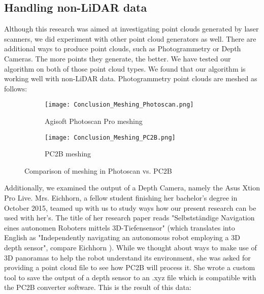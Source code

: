 \subsection{Handling non-LiDAR data}

Although this research was aimed at investigating point clouds generated by laser scanners, we did experiment with other point cloud generators as well. There are additional ways to produce point clouds, such as Photogrammetry or Depth Cameras. The more points they generate, the better. We have tested our algorithm on both of those point cloud types. We found that our algorithm is working well with non-LiDAR data. Photogrammetry point clouds are meshed as follows:

\begin{figure}[h]
	\centering
	\begin{subfigure}[b]{0.49\textwidth}
		\centering
		\texttt{[image: Conclusion\_Meshing\_Photoscan.png]}
		\caption{Agisoft Photoscan Pro meshing}
		\label{fig:conclusion_meshing_photoscan}
	\end{subfigure}
	\hfill
	\begin{subfigure}[b]{0.49\textwidth}
		\centering
		\texttt{[image: Conclusion\_Meshing\_PC2B.png]}
		\caption{PC2B meshing}
		\label{fig:conclusion_meshing_pc2b}
	\end{subfigure}
	\caption{Comparison of meshing in Photoscan vs. PC2B}
	\label{fig:conclusion_meshing_photoscan_vs_pc2b}
\end{figure}

\pagebreak

Additionally, we examined the output of a Depth Camera, namely the Asus Xtion Pro Live. Mrs. Eichhorn, a fellow student finishing her bachelor's degree in October 2015, teamed up with us to study ways how our present research can be used with her's. The title of her research paper reads "Selbstständige Navigation eines autonomen Roboters mittels 3D-Tiefensensor" (which translates into English as "Independently navigating an autonomous robot employing a 3D depth sensor", compare Eichhorn \parencite{anja_eichhorn}). While we thought about ways to make use of 3D panoramas to help the robot understand its environment, she was asked for providing a point cloud file to see how PC2B will process it. She wrote a custom tool to save the output of a depth sensor to an .xyz file which is compatible with the PC2B converter software. This is the result of this data:

